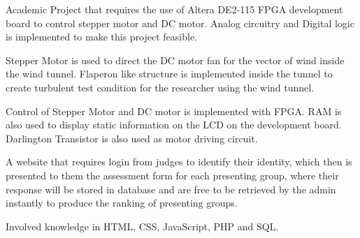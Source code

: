 \documentclass[letterpaper]{deedy-resume} %
\begin{document}
\begin{minipage}[t]{0.33\textwidth}
\end{minipage}
\hfill
\begin{minipage}[t]{0.66\textwidth}

\vspace{\topsep}
\begin{tightitemize}
\item Academic Project that requires the use of Altera DE2-115 FPGA development board to control stepper motor and DC motor. Analog circuitry and Digital logic is implemented to make this project feasible.
\item Stepper Motor is used to direct the DC motor fan for the vector of wind inside the wind tunnel. 
Flaperon like structure is implemented inside the tunnel to create turbulent test condition for the researcher using the wind tunnel.
\item Control of Stepper Motor and DC motor is implemented with FPGA. RAM is also used to display static information on the LCD on the development board. Darlington Transistor is also used as motor driving circuit.
\end{tightitemize} 
\sectionspace %

\vspace{\topsep}
\begin{tightitemize}
\item A website that requires login from judges to identify their identity, which then is presented to them the assessment form for each presenting group, 
where their response will be stored in database and are free to be retrieved by the admin instantly to produce the ranking of presenting groups.
\item Involved knowledge in HTML, CSS, JavaScript, PHP and SQL.
\end{tightitemize} 
\sectionspace %

\end{minipage}
\end{document}
